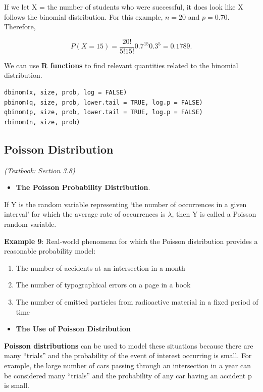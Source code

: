 \documentclass[
]{book}
\providecommand{\tightlist}{%
  \setlength{\itemsep}{0pt}\setlength{\parskip}{0pt}}
\begin{document}
If we let X = the number of students who were successful, it does look like X follows the binomial distribution. For this example, \(n = 20\) and \(p = 0.70\). Therefore,

\[
P(X=15) = \frac{20!}{5!15!} 0.7^{15} 0.3^5 =  0.1789.
\]

We can use \textbf{R functions} to find relevant quantities related to the binomial distribution.

\begin{verbatim}
dbinom(x, size, prob, log = FALSE)
pbinom(q, size, prob, lower.tail = TRUE, log.p = FALSE)
qbinom(p, size, prob, lower.tail = TRUE, log.p = FALSE)
rbinom(n, size, prob)
\end{verbatim}

\hypertarget{poisson-distribution}{%
\subsection{Poisson Distribution}\label{poisson-distribution}}

\emph{(Textbook: Section 3.8)}

\begin{itemize}
\tightlist
\item
  \textbf{The Poisson Probability Distribution}.
\end{itemize}

If Y is the random variable representing `the number of occurrences in a given interval' for which the average rate of occurrences is \(\lambda\), then Y is called a Poisson random variable.

\textbf{Example 9}: Real-world phenomena for which the Poisson distribution provides a reasonable probability model:

\begin{enumerate}
\def\labelenumi{\arabic{enumi}.}
\tightlist
\item
  The number of accidents at an intersection in a month
\item
  The number of typographical errors on a page in a book
\item
  The number of emitted particles from radioactive material in a fixed period of time
\end{enumerate}

\begin{itemize}
\tightlist
\item
  \textbf{The Use of Poisson Distribution}
\end{itemize}

\textbf{Poisson distributions} can be used to model these situations because there are many ``trials'' and the probability of the event of interest occurring is small. For example, the large number of cars passing through an intersection in a year can be considered many ``trials'' and the probability of any car having an accident p is small.
\end{document}
